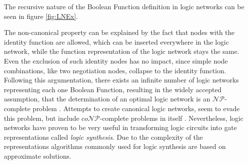 The recursive nature of the Boolean Function definition in logic networks can be seen in figure \ref{fig:LNEx}.

The non-canonical property can be explained by the fact that nodes with the identity function are allowed, which can be inserted everywhere in the logic network, while the function representation of the logic network stays the same. Even the exclusion of such identity nodes has no impact, since simple node combinations, like two negotiation nodes, collapse to the identity function. Following this argumentation, there exists an infinite number of logic networks representing each one Boolean Function, resulting in the widely accepted assumption, that the determination of an optimal logic network is an $\mathcal{NP}$-complete problem \cite{Walter}. Attempts to create canonical logic networks, seem to evade this problem, but include $co\mathcal{NP}$-complete problems in itself \cite{LogicNetwork}.
Nevertheless, logic networks have proven to be very useful in transforming logic circuits into gate representations called \textit{logic synthesis}. Due to the complexity of the representations algorithms commonly used for logic synthesis are based on approximate solutions.




